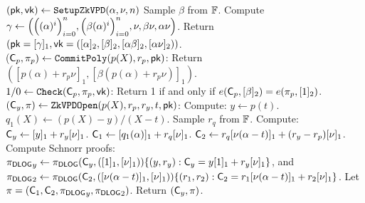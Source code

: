 \def\hp{\hspace*{0.1in}}
\begin{scriptsize}
\begin{algorithm}[bt]
$(\mathsf{pk}, \mathsf{vk}) \leftarrow {\texttt{SetupZkVPD}}(\alpha, \nu, n)$
\newline
Sample $\beta$ from $\mathbb{F}$.
Compute $\gamma \leftarrow \left(
\Bigl((\alpha)^i\Bigr)^{n}_{i=0},
\Bigl(\beta(\alpha)^i\Bigr)^{n}_{i=0},
\nu,
\beta \nu,
\alpha \nu
\right)$.
\newline
Return $(\mathsf{pk} = [\gamma]_1, \mathsf{vk}=([\alpha]_2, [\beta]_2, [\alpha \beta]_2, [\alpha \nu]_2))$.
\newline
\\
(${\mathsf{C}}_{p},\pi_p) \leftarrow
	 \texttt{CommitPoly}(p(X), r_p, \mathsf{pk})$:  \hp \newline
Return $\left([p(\alpha) + r_p \nu]_1, [\beta(p(\alpha)  + r_p \nu)]_1\right)$.
\newline
\\
$1/0 \leftarrow \texttt{Check}({\mathsf{C}}_p,\pi_{p},\mathsf{vk})$:
 \hp Return 1 if and only if $e({\mathsf{C}}_p, [\beta]_2) = e(\pi_{p},
	[1]_2)$.
\newline
\\
$({\mathsf{C}}_y,\pi) \leftarrow
	\texttt{ZkVPDOpen}(p(X), r_p, r_y, t, \mathsf{pk})$:  \newline
Compute: $y \leftarrow p(t)$.
$q_1(X) \leftarrow (p(X) - y)/(X-t)$.  \newline
Sample $r_q$ from $\mathbb{F}$.
Compute: \newline
${\mathsf{C}}_y \leftarrow [y]_1 + r_y[\nu]_1$. \newline
${\mathsf{C}}_1 \leftarrow [q_1(\alpha)]_1 + r_q [\nu]_1$. \newline 
${\mathsf{C}}_2 \leftarrow r_q[\nu(\alpha-t)]_1 + (r_y-r_p)[\nu]_1$. \newline
Compute Schnorr proofs: \newline
${\pi_{{\textsf{DLOG}}}}_{y} \leftarrow {\pi_{{\textsf{DLOG}}}}({\mathsf{C}}_y, ([1]_1, [\nu]_1))
		\{(y,r_y): {\mathsf{C}}_y = y[1]_1 + r_y [\nu]_1\}$, and
${\pi_{{\textsf{DLOG}}}}_{2} \leftarrow {\pi_{{\textsf{DLOG}}}}({\mathsf{C}}_2, ([\nu(\alpha-t)]_1, [\nu]_1))\{(r_1, r_2): {\mathsf{C}}_2 = r_1[\nu(\alpha-t)]_1 + r_2[\nu]_1\}$.
\newline
Let $\pi = ({\mathsf{C}}_1, {\mathsf{C}}_2, {\pi_{{\textsf{DLOG}}}}_{y}, {\pi_{{\textsf{DLOG}}}}_{2})$.
Return $({\mathsf{C}}_y, \pi)$.
\newline


\end{algorithm}
\end{scriptsize}
